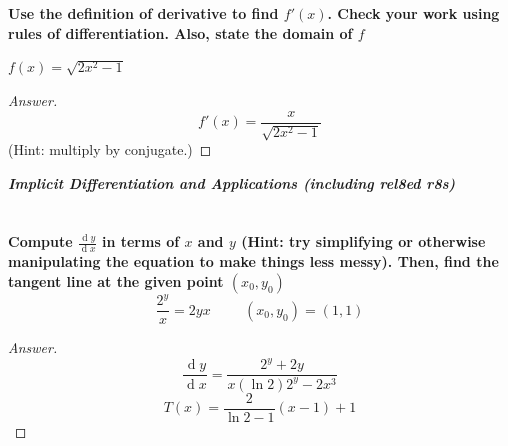 \documentclass[english,fleqn]{article}
\renewcommand{\d}[1]{\ensuremath{\operatorname{d}\!{#1}}}
\newcommand{\dydx}[2]{\frac{\d #1}{\d #2}}
\newcommand{\prob}[1]{\setcounter{section}{#1-1}\section{}}
\theoremstyle{remark}
\theoremstyle{definition}
\newcommand{\ild}[1]{\displaystyle{#1}}
\begin{document}
\prob{0}\textbf{Use the definition of derivative to find $f'(x)$. Check your work using rules of differentiation. Also, state the domain of $f$}

$\ild{f(x)=\sqrt{2x^2-1}}$
\begin{proof}[Answer]
	$$f'(x)=\frac{x}{\sqrt{2x^2-1}}$$
(Hint: multiply by conjugate.)
\end{proof}
     
\newpage
	\begin{center}{\Large\textbf{\emph{Implicit Differentiation and Applications (including rel8ed r8s)}}}\end{center}
	\prob{1} \textbf{Compute $\dydx{y}{x}$ in terms of $x$ and $y$ (Hint: try simplifying or otherwise manipulating the equation to make things less messy). Then, find the tangent line at the given point $(x_0,y_0)$}\newline
	$$\ild{\frac{2^{y}}{x}=2yx}\hspace{1cm}(x_0,y_0)=(1,1)$$
	\begin{proof}[Answer]
$$\dydx{y}{x}=\frac{2^y+2y}{x(\ln2)2^y-2x^3}$$ $$T(x)=\frac{2}{\ln2-1}(x-1)+1$$
	\end{proof}
\end{document}
